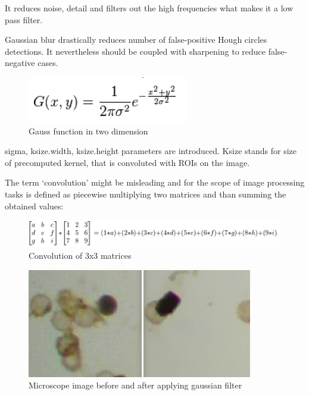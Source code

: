 \documentclass[12pt,twoside,a4paper]{article}
\begin{document}
It reduces noise, detail and filters out the high frequencies what makes it a low pass filter.\cite{cv}

Gaussian blur drastically reduces number of false-positive Hough circles detections. It nevertheless should be coupled with sharpening to reduce false-negative cases.\cite{cnoisy} 


\begin{figure}[H]
\centering
\includegraphics[width=0.4\paperwidth]{gauss}
\caption{Gauss function in two dimension\cite{featproc}}\label{fig:featproc}
\end{figure}


sigma, ksize.width, ksize.height  parameters are introduced.
Ksize stands for size of precomputed kernel, that is convoluted with ROIs on the image.

The term ‘convolution’ might be misleading and for the scope of image processing tasks is defined as piecewise multiplying two matrices and than summing the obtained values:

 
\begin{figure}[H]
\centering
\includegraphics[width=0.8\paperwidth]{conv}
\caption{Convolution of 3x3 matrices\cite{gimp}}\label{fig:conv}
\end{figure}

 
\begin{figure}[H]
\centering
\includegraphics[width=0.4\paperwidth]{micro}
\caption{Microscope image before and after applying gaussian filter\cite{cnoisy}}\label{fig:micro}
\end{figure}

  
\end{document}
